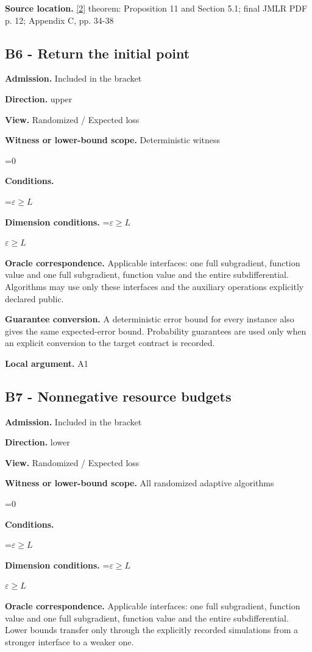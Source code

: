 \documentclass[10pt,a4paper]{article}
\newcommand{\AtlasMath}[1]{\par\begingroup\centering\setbox0=\hbox{$\displaystyle #1$}\ifdim\wd0>1.4\linewidth\typeout{ATLAS WIDE FORMULA: \the\wd0}\fi\ifdim\wd0>\linewidth\resizebox{\linewidth}{!}{\box0}\else\box0\fi\par\endgroup}
\newcommand{\AtlasInlineMath}[1]{\begingroup\setbox0=\hbox{$#1$}\ifdim\wd0>.4\linewidth\endgroup\AtlasMath{#1}\else\endgroup$#1$\fi}
\begin{document}
\textbf{Source location.} \href{https://www.jmlr.org/papers/volume23/21-1507/21-1507.pdf}{[2]} theorem: Proposition 11 and Section 5.1; final JMLR PDF p. 12; Appendix C, pp. 34-38

\subsection{B6 - Return the initial point}
\textbf{Admission.} Included in the bracket

\textbf{Direction.} upper

\textbf{View.} Randomized / Expected loss

\textbf{Witness or lower-bound scope.} Deterministic witness

\AtlasMath{0}
\textbf{Conditions.} 
\AtlasMath{\varepsilon\ge L}


\textbf{Dimension conditions.} \AtlasInlineMath{\varepsilon\ge L}

\textbf{Oracle correspondence.} Applicable interfaces: one full subgradient, function value and one full subgradient, function value and the entire subdifferential. Algorithms may use only these interfaces and the auxiliary operations explicitly declared public.

\textbf{Guarantee conversion.} A deterministic error bound for every instance also gives the same expected-error bound. Probability guarantees are used only when an explicit conversion to the target contract is recorded.

\textbf{Local argument.} A1

\subsection{B7 - Nonnegative resource budgets}
\textbf{Admission.} Included in the bracket

\textbf{Direction.} lower

\textbf{View.} Randomized / Expected loss

\textbf{Witness or lower-bound scope.} All randomized adaptive algorithms

\AtlasMath{0}
\textbf{Conditions.} 
\AtlasMath{\varepsilon\ge L}


\textbf{Dimension conditions.} \AtlasInlineMath{\varepsilon\ge L}

\textbf{Oracle correspondence.} Applicable interfaces: one full subgradient, function value and one full subgradient, function value and the entire subdifferential. Lower bounds transfer only through the explicitly recorded simulations from a stronger interface to a weaker one.
\end{document}
